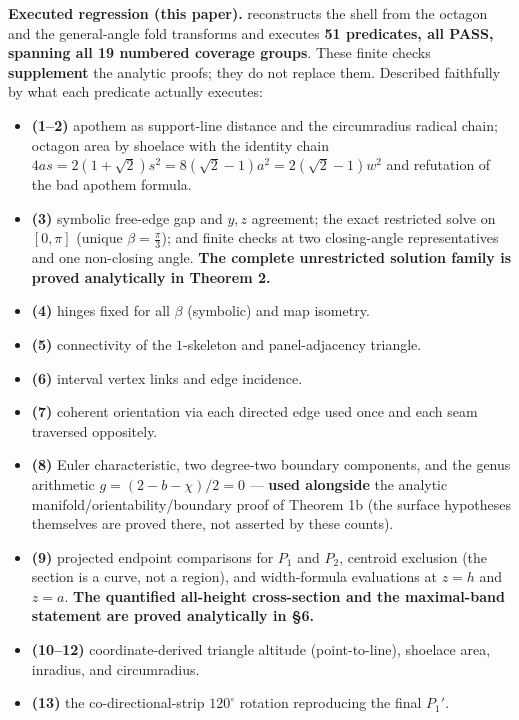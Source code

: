 \documentclass[
  11pt,
  a4paper,
]{article}
\providecommand{\tightlist}{%
  \setlength{\itemsep}{0pt}\setlength{\parskip}{0pt}}
\begin{document}
\textbf{Executed regression (this paper).}  reconstructs the shell from the octagon and the general-angle fold transforms and executes \textbf{51 predicates, all PASS, spanning all 19 numbered coverage groups}. These finite checks \textbf{supplement} the analytic proofs; they do not replace them. Described faithfully by what each predicate actually executes:

\begin{itemize}
\tightlist
\item
  \textbf{(1--2)} apothem as support-line distance and the circumradius radical chain; octagon area by shoelace with the identity chain \(4as=2(1+\sqrt2)s^2=8(\sqrt2-1)a^2=2(\sqrt2-1)w^2\) and refutation of the bad apothem formula.
\item
  \textbf{(3)} symbolic free-edge gap and \(y,z\) agreement; the exact restricted solve on \([0,\pi]\) (unique \(\beta=\tfrac\pi3\)); and finite checks at two closing-angle representatives and one non-closing angle. \textbf{The complete unrestricted solution family is proved analytically in Theorem 2.}
\item
  \textbf{(4)} hinges fixed for all \(\beta\) (symbolic) and map isometry.
\item
  \textbf{(5)} connectivity of the \(1\)-skeleton and panel-adjacency triangle.
\item
  \textbf{(6)} interval vertex links and edge incidence.
\item
  \textbf{(7)} coherent orientation via each directed edge used once and each seam traversed oppositely.
\item
  \textbf{(8)} Euler characteristic, two degree-two boundary components, and the genus arithmetic \(g=(2-b-\chi)/2=0\) --- \textbf{used alongside} the analytic manifold/orientability/boundary proof of Theorem 1b (the surface hypotheses themselves are proved there, not asserted by these counts).
\item
  \textbf{(9)} projected endpoint comparisons for \(P_1\) and \(P_2\), centroid exclusion (the section is a curve, not a region), and width-formula evaluations at \(z=h\) and \(z=a\). \textbf{The quantified all-height cross-section and the maximal-band statement are proved analytically in §6.}
\item
  \textbf{(10--12)} coordinate-derived triangle altitude (point-to-line), shoelace area, inradius, and circumradius.
\item
  \textbf{(13)} the co-directional-strip \(120^\circ\) rotation reproducing the final \(P_1'\).

\end{itemize}
\end{document}

